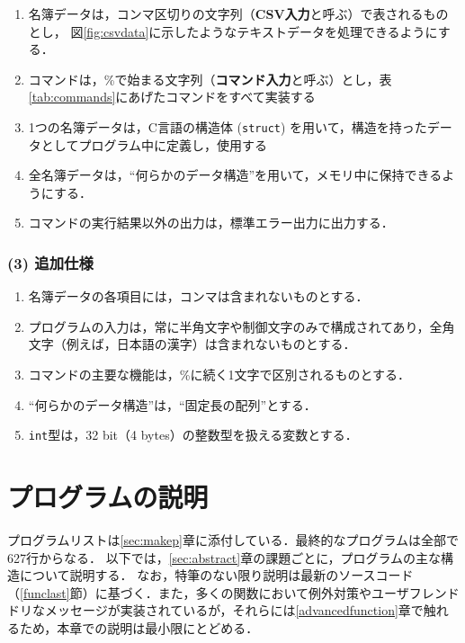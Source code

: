 \begin{enumerate}
  \setlength{\parskip}{0em} \setlength{\itemsep}{0.25em}  %
    \item 名簿データは，コンマ区切りの文字列（\textbf{CSV入力}と呼ぶ）で表されるものとし，
          図\ref{fig:csvdata}に示したようなテキストデータを処理できるようにする．%
    \item コマンドは，\%で始まる文字列（\textbf{コマンド入力}と呼ぶ）とし，表\ref{tab:commands}にあげたコマンドをすべて実装する
    \item 1つの名簿データは，C言語の構造体 (\texttt{struct}) を用いて，構造を持ったデータとしてプログラム中に定義し，使用する
    \item 全名簿データは，“何らかのデータ構造”を用いて，メモリ中に保持できるようにする．
    \item コマンドの実行結果以外の出力は，標準エラー出力に出力する．
\end{enumerate}

\subsubsection*{(3) 追加仕様}

\begin{enumerate}
    \item 名簿データの各項目には，コンマは含まれないものとする．
    \item プログラムの入力は，常に半角文字や制御文字のみで構成されてあり，全角文字（例えば，日本語の漢字）は含まれないものとする．
    \item コマンドの主要な機能は，\%に続く1文字で区別されるものとする．
    \item “何らかのデータ構造”は，“固定長の配列”とする．
    \item \verb|int|型は，32 bit（4 bytes）の整数型を扱える変数とする．
\end{enumerate}

\section{プログラムの説明}\label{sec:capp}

プログラムリストは\ref{sec:makep}章に添付している．最終的なプログラムは全部で627行からなる．
以下では，\ref{sec:abstract}章の課題ごとに，プログラムの主な構造について説明する．
なお，特筆のない限り説明は最新のソースコード（\ref{funclast}節）に基づく．また，多くの関数において例外対策やユーザフレンドドリなメッセージが実装されているが，それらには\ref{advancedfunction}章で触れるため，本章での説明は最小限にとどめる．

